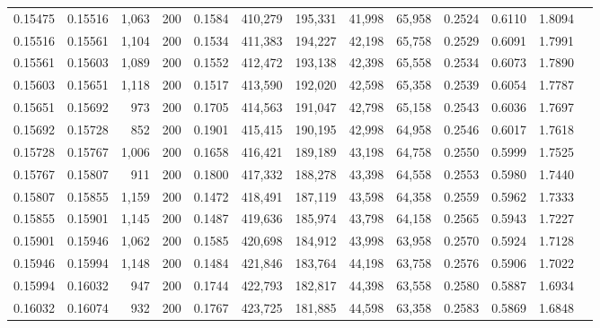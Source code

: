 \begin{tabular}{rrrrrrrrrrrrr}
0.15475 & 0.15516 & 1,063 & 200 &                                     0.1584 & 410,279 & 195,331 &  41,998 &  65,958 & 0.2524 & 0.6110 & 1.8094 \\
0.15516 & 0.15561 & 1,104 & 200 &                                     0.1534 & 411,383 & 194,227 &  42,198 &  65,758 & 0.2529 & 0.6091 & 1.7991 \\
0.15561 & 0.15603 & 1,089 & 200 &                                     0.1552 & 412,472 & 193,138 &  42,398 &  65,558 & 0.2534 & 0.6073 & 1.7890 \\
0.15603 & 0.15651 & 1,118 & 200 &                                     0.1517 & 413,590 & 192,020 &  42,598 &  65,358 & 0.2539 & 0.6054 & 1.7787 \\
0.15651 & 0.15692 &   973 & 200 &                                     0.1705 & 414,563 & 191,047 &  42,798 &  65,158 & 0.2543 & 0.6036 & 1.7697 \\
0.15692 & 0.15728 &   852 & 200 &                                     0.1901 & 415,415 & 190,195 &  42,998 &  64,958 & 0.2546 & 0.6017 & 1.7618 \\
0.15728 & 0.15767 & 1,006 & 200 &                                     0.1658 & 416,421 & 189,189 &  43,198 &  64,758 & 0.2550 & 0.5999 & 1.7525 \\
0.15767 & 0.15807 &   911 & 200 &                                     0.1800 & 417,332 & 188,278 &  43,398 &  64,558 & 0.2553 & 0.5980 & 1.7440 \\
0.15807 & 0.15855 & 1,159 & 200 &                                     0.1472 & 418,491 & 187,119 &  43,598 &  64,358 & 0.2559 & 0.5962 & 1.7333 \\
0.15855 & 0.15901 & 1,145 & 200 &                                     0.1487 & 419,636 & 185,974 &  43,798 &  64,158 & 0.2565 & 0.5943 & 1.7227 \\
0.15901 & 0.15946 & 1,062 & 200 &                                     0.1585 & 420,698 & 184,912 &  43,998 &  63,958 & 0.2570 & 0.5924 & 1.7128 \\
0.15946 & 0.15994 & 1,148 & 200 &                                     0.1484 & 421,846 & 183,764 &  44,198 &  63,758 & 0.2576 & 0.5906 & 1.7022 \\
0.15994 & 0.16032 &   947 & 200 &                                     0.1744 & 422,793 & 182,817 &  44,398 &  63,558 & 0.2580 & 0.5887 & 1.6934 \\
0.16032 & 0.16074 &   932 & 200 &                                     0.1767 & 423,725 & 181,885 &  44,598 &  63,358 & 0.2583 & 0.5869 & 1.6848 \\

\end{tabular}
